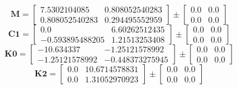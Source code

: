 \documentclass[../../report/parameterReport.tex]{subfiles}
\begin{document}
\begin{equation}
\mathbf{M}=
\left[
\begin{array}{rr}
    7.5302104085 & 0.808052540283\\
    0.808052540283 & 0.294495552959
\end{array}
\right]
\pm
\left[
\begin{array}{rr}
    0.0 & 0.0\\
    0.0 & 0.0
\end{array}
\right]
\label{eq:M}
\end{equation}
\begin{equation}
\mathbf{C1}=
\left[
\begin{array}{rr}
    0.0 & 6.60262512435\\
    -0.593895488205 & 1.21513253408
\end{array}
\right]
\pm
\left[
\begin{array}{rr}
    0.0 & 0.0\\
    0.0 & 0.0
\end{array}
\right]
\label{eq:C1}
\end{equation}
\begin{equation}
\mathbf{K0}=
\left[
\begin{array}{rr}
    -10.634337 & -1.25121578992\\
    -1.25121578992 & -0.448373275945
\end{array}
\right]
\pm
\left[
\begin{array}{rr}
    0.0 & 0.0\\
    0.0 & 0.0
\end{array}
\right]
\label{eq:K0}
\end{equation}
\begin{equation}
\mathbf{K2}=
\left[
\begin{array}{rr}
    0.0 & 10.6714578831\\
    0.0 & 1.31052970923
\end{array}
\right]
\pm
\left[
\begin{array}{rr}
    0.0 & 0.0\\
    0.0 & 0.0
\end{array}
\right]
\label{eq:K2}
\end{equation}
\end{document}
